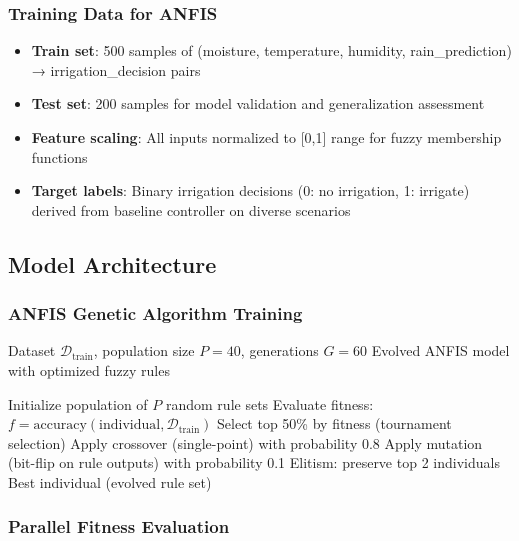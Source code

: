 \subsubsection{Training Data for ANFIS}

\begin{itemize}
    \item \textbf{Train set}: 500 samples of (moisture, temperature, humidity, rain\_prediction) → irrigation\_decision pairs
    \item \textbf{Test set}: 200 samples for model validation and generalization assessment
    \item \textbf{Feature scaling}: All inputs normalized to [0,1] range for fuzzy membership functions
    \item \textbf{Target labels}: Binary irrigation decisions (0: no irrigation, 1: irrigate) derived from baseline controller on diverse scenarios
\end{itemize}

\subsection{Model Architecture}

\subsubsection{ANFIS Genetic Algorithm Training}

\begin{algorithm}
\caption{ANFIS-GA Training}
\label{alg:anfis-ga}
\begin{algorithmic}[1]
\REQUIRE Dataset $\mathcal{D}_{\text{train}}$, population size $P = 40$, generations $G = 60$
\ENSURE Evolved ANFIS model with optimized fuzzy rules

\STATE Initialize population of $P$ random rule sets
        \STATE Evaluate fitness: $f = \text{accuracy}(\text{individual}, \mathcal{D}_{\text{train}})$
    \ENDFOR
    \STATE Select top 50\% by fitness (tournament selection)
    \STATE Apply crossover (single-point) with probability 0.8
    \STATE Apply mutation (bit-flip on rule outputs) with probability 0.1
    \STATE Elitism: preserve top 2 individuals
\ENDFOR
\RETURN Best individual (evolved rule set)
\end{algorithmic}
\end{algorithm}

\subsubsection{Parallel Fitness Evaluation}

